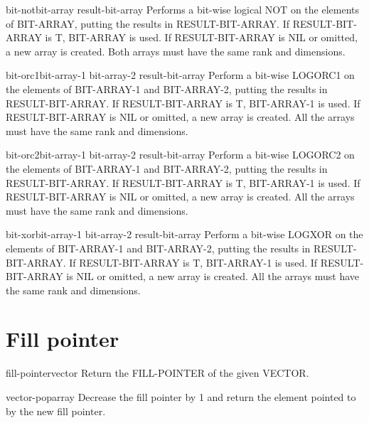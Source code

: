\documentclass[10pt,english]{book}
\begin{document}
\begin{function}{bit-not}{bit-array \op result-bit-array}
  Performs a bit-wise logical NOT on the elements of BIT-ARRAY,
  putting the results in RESULT-BIT-ARRAY. If RESULT-BIT-ARRAY is T,
  BIT-ARRAY is used. If RESULT-BIT-ARRAY is NIL or omitted, a new array is
  created. Both arrays must have the same rank and dimensions.
\end{function}

\begin{function}{bit-orc1}{bit-array-1 bit-array-2 \op result-bit-array}
  Perform a bit-wise LOGORC1 on the elements of BIT-ARRAY-1 and BIT-ARRAY-2,
  putting the results in RESULT-BIT-ARRAY. If RESULT-BIT-ARRAY is T,
  BIT-ARRAY-1 is used. If RESULT-BIT-ARRAY is NIL or omitted, a new array is
  created. All the arrays must have the same rank and dimensions.
\end{function}

\begin{function}{bit-orc2}{bit-array-1 bit-array-2 \op result-bit-array}
  Perform a bit-wise LOGORC2 on the elements of BIT-ARRAY-1 and BIT-ARRAY-2,
  putting the results in RESULT-BIT-ARRAY. If RESULT-BIT-ARRAY is T,
  BIT-ARRAY-1 is used. If RESULT-BIT-ARRAY is NIL or omitted, a new array is
  created. All the arrays must have the same rank and dimensions.
\end{function}

\begin{function}{bit-xor}{bit-array-1 bit-array-2 \op result-bit-array}
  Perform a bit-wise LOGXOR on the elements of BIT-ARRAY-1 and BIT-ARRAY-2,
  putting the results in RESULT-BIT-ARRAY. If RESULT-BIT-ARRAY is T,
  BIT-ARRAY-1 is used. If RESULT-BIT-ARRAY is NIL or omitted, a new array is
  created. All the arrays must have the same rank and dimensions.
\end{function}

\section{Fill pointer}
\label{sec:fill-pointer}

\begin{accessor}{fill-pointer}{vector}
  Return the FILL-POINTER of the given VECTOR.
\end{accessor}

\begin{function}{vector-pop}{array}
  Decrease the fill pointer by 1 and return the element pointed to by the
  new fill pointer.
\end{function}
\end{document}
